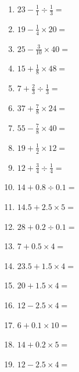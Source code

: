 \documentclass[12pt]{article}
\begin{document}
\begin{enumerate}
\item \large $ 23 - \frac{1}{1} \div \frac{1}{3} = $ \vspace{1.6cm}
\item \large $ 19 - \frac{1}{4} \times 20 = $ \vspace{1.6cm}
\item \large $ 25 - \frac{3}{10} \times 40 = $ \vspace{1.6cm}
\item \large $ 15 + \frac{1}{8} \times 48 = $ \vspace{1.6cm}
\newpage
\item \large $ 7 + \frac{2}{3} \div \frac{1}{3} = $ \vspace{1.6cm}
\item \large $ 37 + \frac{7}{8} \times 24 = $ \vspace{1.6cm}
\item \large $ 55 - \frac{7}{8} \times 40 = $ \vspace{1.6cm}
\item \large $ 19 + \frac{1}{2} \times 12 = $ \vspace{1.6cm}
\item \large $ 12 + \frac{3}{4} \div \frac{1}{4} = $ \vspace{1.6cm}
\item \large $ 14 + 0.8 \div 0.1 = $ \vspace{1.6cm}
\item \large $ 14.5 + 2.5 \times 5 = $ \vspace{1.6cm}
\item \large $ 28 + 0.2 \div 0.1 = $ \vspace{1.6cm}
\item \large $ 7 + 0.5 \times 4 = $ \vspace{1.6cm}
\item \large $ 23.5 + 1.5 \times 4 = $ \vspace{1.6cm}
\newpage
\item \large $ 20 + 1.5 \times 4 = $ \vspace{1.6cm}
\item \large $ 12 - 2.5 \times 4 = $ \vspace{1.6cm}
\item \large $ 6 + 0.1 \times 10 = $ \vspace{1.6cm}
\item \large $ 14 + 0.2 \times 5 = $ \vspace{1.6cm}
\item \large $ 12 - 2.5 \times 4 = $ \vspace{1.6cm}

\end{enumerate}
\end{document}
